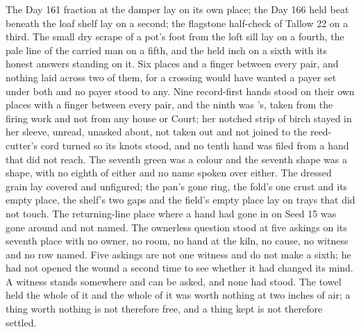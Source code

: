 The Day 161 fraction at the damper lay on its own place; the Day 166 held beat beneath the loaf shelf lay on a second; the flagstone half-check of Tallow 22 on a third. The small dry scrape of a pot's foot from the loft sill lay on a fourth, the pale line of the carried man on a fifth, and the held inch on a sixth with its honest answers standing on it. Six places and a finger between every pair, and nothing laid across two of them, for a crossing would have wanted a payer set under both and no payer stood to any. Nine record-first hands stood on their own places with a finger between every pair, and the ninth was 's, taken from the firing work and not from any house or Court; her notched strip of birch stayed in her sleeve, unread, unasked about, not taken out and not joined to the reed-cutter's cord turned so its knots stood, and no tenth hand was filed from a hand that did not reach. The seventh green was a colour and the seventh shape was a shape, with no eighth of either and no name spoken over either. The dressed grain lay covered and unfigured; the pan's gone ring, the fold's one crust and its empty place, the shelf's two gaps and the field's empty place lay on trays that did not touch. The returning-line place where a hand had gone in on Seed 15 was gone around and not named. The ownerless question stood at five askings on its seventh place with no owner, no room, no hand at the kiln, no cause, no witness and no row named. Five askings are not one witness and do not make a sixth; he had not opened the wound a second time to see whether it had changed its mind. A witness stands somewhere and can be asked, and none had stood. The towel held the whole of it and the whole of it was worth nothing at two inches of air; a thing worth nothing is not therefore free, and a thing kept is not therefore settled.

